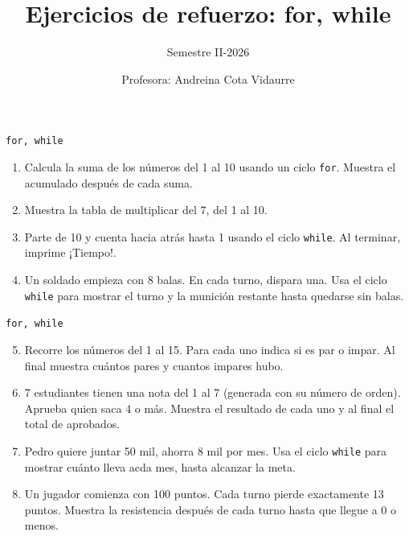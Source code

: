 \documentclass{beamer}
\title{Ejercicios de refuerzo: for, while} %
\subtitle{Semestre II-2026} %
\author{Profesora: Andreina Cota Vidaurre}
\begin{document}
  \shorthandoff{-}
  \frame[c]{\maketitle}


    \begin{frame}[fragile,t]{\texttt{for, while}}
        \begin{enumerate}
            \item Calcula la suma de los números del 1 al 10 usando un ciclo \texttt{for}. Muestra el acumulado después de cada suma.
            \item Muestra la tabla de multiplicar del 7, del 1 al 10.
            \item Parte de 10 y cuenta hacia atrás hasta 1 usando el ciclo \texttt{while}. Al terminar, imprime ¡Tiempo!.
            \item Un soldado empieza con 8 balas. En cada turno, dispara una. Usa el ciclo \texttt{while} para mostrar el turno y la munición restante hasta quedarse sin balas.
        \end{enumerate}
    \end{frame}

    \begin{frame}[fragile,t]{\texttt{for, while}}
        \begin{enumerate}
            \setcounter{enumi}{4}
            \item Recorre los números del 1 al 15. Para cada uno indica si es par o impar. Al final muestra cuántos pares y cuantos impares hubo.
            \item 7 estudiantes tienen una nota del 1 al 7 (generada con su número de orden). Aprueba quien saca 4 o más. Muestra el resultado de cada uno y al final el total de aprobados.
            \item Pedro quiere juntar 50 mil, ahorra 8 mil por mes. Usa el ciclo \texttt{while} para mostrar cuánto lleva acda mes, hasta alcanzar la meta.
            \item Un jugador comienza con 100 puntos. Cada turno pierde exactamente 13 puntos. Muestra la resistencia después de cada turno hasta que llegue a 0 o menos.
        \end{enumerate}
    \end{frame}
\end{document}
